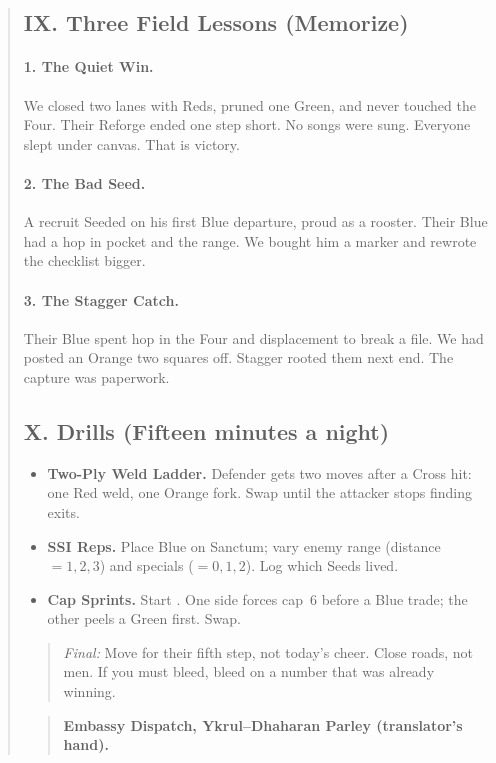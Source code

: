 \documentclass[11pt]{article}
\newcommand{\CapC}[1]{\textcolor{green!40!black}{\scriptsize\ttfamily[G:#1]}}
\begin{document}
\begin{quote}
\subsection{IX. Three Field Lessons (Memorize)}
\paragraph{1. The Quiet Win.} We closed two lanes with Reds, pruned one Green, and never touched the Four. Their Reforge ended one step short. No songs were sung. Everyone slept under canvas. That is victory.
\paragraph{2. The Bad Seed.} A recruit Seeded on his first Blue departure, proud as a rooster. Their Blue had a hop in pocket and the range. We bought him a marker and rewrote the checklist bigger.
\paragraph{3. The Stagger Catch.} Their Blue spent hop in the Four and displacement to break a file. We had posted an Orange two squares off. Stagger rooted them next end. The capture was paperwork.

\subsection{X. Drills (Fifteen minutes a night)}
\begin{itemize}\itemsep0.2em
  \item \textbf{Two-Ply Weld Ladder.} Defender gets two moves after a Cross hit: one Red weld, one Orange fork. Swap until the attacker stops finding exits.
  \item \textbf{SSI Reps.} Place Blue on Sanctum; vary enemy range (distance $=1,2,3$) and specials ($=0,1,2$). Log which Seeds lived.
  \item \textbf{Cap Sprints.} Start \CapC{3--2}. One side forces cap~6 before a Blue trade; the other peels a Green first. Swap.
\end{itemize}

\begin{quote}\small
\emph{Final:} Move for their fifth step, not today’s cheer. Close roads, not men. If you must bleed, bleed on a number that was already winning.
\end{quote}
\clearpage

\begin{quote}
\textbf{Embassy Dispatch, Ykrul–Dhaharan Parley (translator’s hand).}


\end{quote}
\end{quote}
\end{document}
